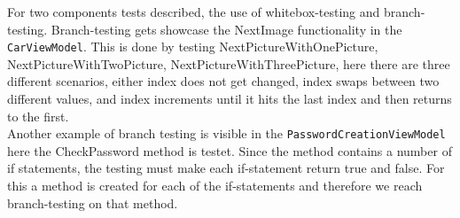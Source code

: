 For two components tests described, the use of whitebox-testing and branch-testing. Branch-testing gets showcase the NextImage functionality in the \texttt{CarViewModel}. This is done by testing NextPictureWithOnePicture, NextPictureWithTwoPicture, NextPictureWithThreePicture, here there are three different scenarios, either index does not get changed, index swaps between two different values, and index increments until it hits the last index and then returns to the first. \\
Another example of branch testing is visible in the \texttt{PasswordCreationViewModel} here the CheckPassword method is testet. Since the method contains a number of if statements, the testing must make each if-statement return true and false. For this a method is created for each of the if-statements and therefore we reach branch-testing on that method.